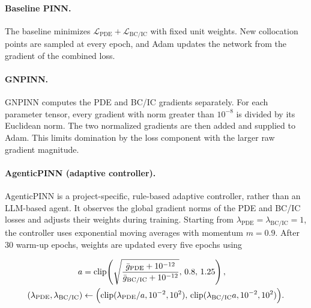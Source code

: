 \documentclass{article}
\begin{document}
\paragraph{Baseline PINN.}
The baseline minimizes $\mathcal{L}_{\mathrm{PDE}}+\mathcal{L}_{\mathrm{BC/IC}}$ with fixed unit weights. New collocation points are sampled at every epoch, and Adam updates the network from the gradient of the combined loss.

\paragraph{GNPINN.}
GNPINN computes the PDE and BC/IC gradients separately. For each parameter tensor, every gradient with norm greater than $10^{-8}$ is divided by its Euclidean norm. The two normalized gradients are then added and supplied to Adam. This limits domination by the loss component with the larger raw gradient magnitude.

\paragraph{AgenticPINN (adaptive controller).}
AgenticPINN is a project-specific, rule-based adaptive controller, rather than an LLM-based agent. It observes the global gradient norms of the PDE and BC/IC losses and adjusts their weights during training. Starting from $\lambda_{\mathrm{PDE}}=\lambda_{\mathrm{BC/IC}}=1$, the controller uses exponential moving averages with momentum $m=0.9$. After 30 warm-up epochs, weights are updated every five epochs using

\begin{equation}
\begin{aligned}
a&=\operatorname{clip}\!\left(
\sqrt{\frac{\bar g_{\mathrm{PDE}}+10^{-12}}
{\bar g_{\mathrm{BC/IC}}+10^{-12}}},\,0.8,\,1.25\right),\\
(\lambda_{\mathrm{PDE}},\lambda_{\mathrm{BC/IC}})
&\leftarrow
\Bigl(
\operatorname{clip}(\lambda_{\mathrm{PDE}}/a,10^{-2},10^2),\,
\operatorname{clip}(\lambda_{\mathrm{BC/IC}}a,10^{-2},10^2)
\Bigr).
\end{aligned}
\end{equation}
\end{document}
